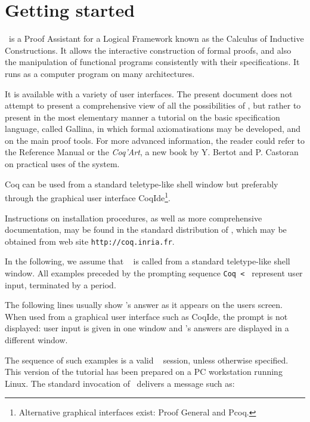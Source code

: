 \documentclass{book}
\begin{document}

\tableofcontents

\chapter*{Getting started}

\Coq\ is a Proof Assistant for a Logical Framework known as the Calculus
of Inductive Constructions. It allows the interactive construction of
formal proofs, and also the manipulation of functional programs 
consistently with their specifications. It runs as a computer program
on many architectures.

It is available with a variety of user interfaces. The present
document does not attempt to present a comprehensive view of all the
possibilities of \Coq, but rather to present in the most elementary
manner a tutorial on the basic specification language, called Gallina,
in which formal axiomatisations may be developed, and on the main
proof tools.  For more advanced information, the reader could refer to
the \Coq{} Reference Manual or the \textit{Coq'Art}, a new book by Y.
Bertot and P. Castoran on practical uses of the \Coq{} system.

Coq can be used from a standard teletype-like shell window but
preferably through the graphical user interface
CoqIde\footnote{Alternative graphical interfaces exist: Proof General
and Pcoq.}.

Instructions on installation procedures, as well as more comprehensive
documentation, may be found in the standard distribution of \Coq,
which may be obtained from \Coq{} web site \texttt{http://coq.inria.fr}.

In the following, we assume that \Coq~ is called from a standard
teletype-like shell window. All examples preceded by the prompting
sequence \verb:Coq < : represent user input, terminated by a
period. 

The following lines usually show \Coq's answer as it appears on the
users screen. When used from a graphical user interface such as
CoqIde, the prompt is not displayed: user input is given in one window
and \Coq's answers are displayed in a different window.

The sequence of such examples is a valid \Coq~
session, unless otherwise specified. This version of the tutorial has
been prepared on a PC workstation running Linux.  The standard
invocation of \Coq\ delivers a message such as:
\end{document}
